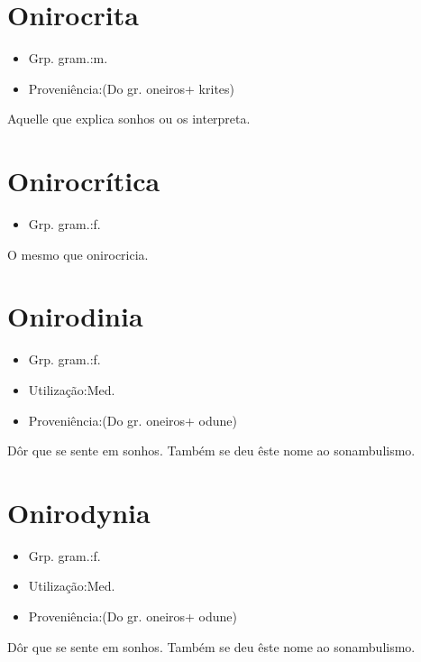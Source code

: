 \section{Onirocrita}
\begin{itemize}
\item {Grp. gram.:m.}
\end{itemize}
\begin{itemize}
\item {Proveniência:(Do gr. \textunderscore oneiros\textunderscore  + \textunderscore krites\textunderscore )}
\end{itemize}
Aquelle que explica sonhos ou os interpreta.
\section{Onirocrítica}
\begin{itemize}
\item {Grp. gram.:f.}
\end{itemize}
O mesmo que \textunderscore onirocricia\textunderscore .
\section{Onirodinia}
\begin{itemize}
\item {Grp. gram.:f.}
\end{itemize}
\begin{itemize}
\item {Utilização:Med.}
\end{itemize}
\begin{itemize}
\item {Proveniência:(Do gr. \textunderscore oneiros\textunderscore  + \textunderscore odune\textunderscore )}
\end{itemize}
Dôr que se sente em sonhos.
Também se deu êste nome ao sonambulismo.
\section{Onirodynia}
\begin{itemize}
\item {Grp. gram.:f.}
\end{itemize}
\begin{itemize}
\item {Utilização:Med.}
\end{itemize}
\begin{itemize}
\item {Proveniência:(Do gr. \textunderscore oneiros\textunderscore  + \textunderscore odune\textunderscore )}
\end{itemize}
Dôr que se sente em sonhos.
Também se deu êste nome ao sonambulismo.
